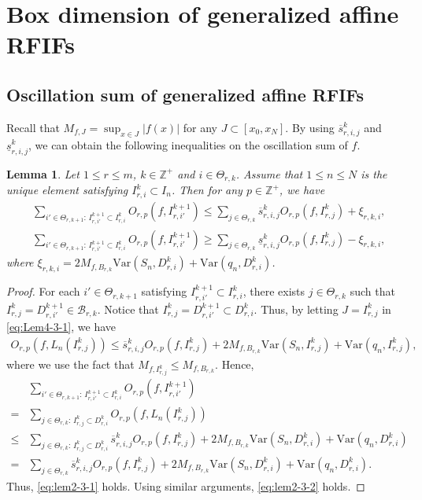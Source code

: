 \documentclass[11pt]{amsart}
\newtheorem{lem}[thm]{Lemma}
\theoremstyle{definition}
\theoremstyle{remark}
\numberwithin{equation}{section}
\newcommand{\Z}{{\mathbb Z}}
\newcommand{\mB}{{\mathcal B}}
\newcommand{\ups}{{\overline{s} }}
\newcommand{\lows}{{\underline{s}}}
\newcommand{\Var}{\mathrm{Var}}
\begin{document}
\section{Box dimension of generalized affine RFIFs}
\subsection{Oscillation sum of generalized affine RFIFs}

Recall that $M_{f,J}=\sup_{x \in J}|f(x)|$ for any $J\subset [x_0,x_N]$. 
By using $\ups_{r,i,j}^{k}$ and $\lows_{r,i,j}^{k}$, we can obtain the following inequalities on the oscillation sum of $f$.

\begin{lem}\label{lem:2-3}
	Let $1\leq r\leq m$, $k \in \Z^+$ and $i\in \Theta_{r,k}$. 	
	Assume that $1 \leq n \leq N$ is the unique element satisfying $I_{r,i}^k \subset I_{n}$.
	Then for any $p \in \mathbb{Z}^+$, we have
	\begin{align}
		&\sum_{i'\in \Theta_{r,k+1}:\, I_{r,i'}^{k+1}\subset I_{r,i}^k} O_{r,p}(f,I_{r,i'}^{k+1}) \leq \sum_{j\in\Theta_{r,k}} \ups_{r,i,j}^k O_{r,p}(f,I_{r,j}^k)+\xi_{r,k,i}, \label{eq:lem2-3-1}\\
		&\sum_{i'\in \Theta_{r,k+1}:\, I_{r,i'}^{k+1}\subset I_{r,i}^k} O_{r,p}(f,I_{r,i'}^{k+1}) \geq \sum_{j\in \Theta_{r,k}} \lows_{r,i,j}^k O_{r,p}(f,I_{r,j}^k)-\xi_{r,k,i}, \label{eq:lem2-3-2}
	\end{align}
	where $\xi_{r,k,i}=2 M_{f,B_{r,k}} \Var (S_{n},D_{r,i}^k)+\Var (q_{n},D_{r,i}^k)$.
\end{lem}

\begin{proof}
	For each $i'\in \Theta_{r,k+1}$ satisfying $I_{r,i'}^{k+1} \subset I_{r,i}^k$, there exists $j\in \Theta_{r,k}$ such that $I_{r,j}^k=D_{r,i'}^{k+1}\in \mB_{r,k}$. 
	Notice that $I_{r,j}^k=D_{r,i'}^{k+1}\subset D_{r,i}^k$. Thus, by letting $J=I_{r,j}^k$ in \eqref{eq:Lem4-3-1}, we have
	\begin{align*}%
		O_{r,p}(f,L_n(I_{r,j}^k)) \leq \ups_{r,i,j}^k O_{r,p}(f,I_{r,j}^k)+ 2 M_{f,B_{r,k}} \Var(S_n,I_{r,j}^k)+\Var(q_n,I_{r,j}^k),
	\end{align*}
	where we use the fact that $M_{f,I_{r,j}^k}\leq M_{f,B_{r,k}}$.	Hence,
	\begin{align*}
		&\sum_{i'\in \Theta_{r,k+1}:\, I_{r,i'}^{k+1}\subset I_{r,i}^k} O_{r,p}(f,I_{r,i'}^{k+1}) \\
		= &\sum_{j\in \Theta_{r,k}:\, I_{r,j}^k\subset D_{r,i}^k}O_{r,p}(f,L_n(I_{r,j}^k)) \\
		\leq &\sum_{j\in \Theta_{r,k}:\, I_{r,j}^k\subset D_{r,i}^k} \ups_{r,i,j}^k O_{r,p}(f,I_{r,j}^k)+2 M_{f,B_{r,k}} \Var (S_{n},D_{r,i}^k)+\Var (q_{n}, D_{r,i}^k)\\
		= &\sum_{j\in \Theta_{r,k}} \ups_{r,i,j}^k O_{r,p}(f,I_{r,j}^k)+2 M_{f,B_{r,k}} \Var (S_{n},D_{r,i}^k)+\Var (q_{n}, D_{r,i}^k).
	\end{align*}
	Thus, \eqref{eq:lem2-3-1} holds. Using similar arguments, \eqref{eq:lem2-3-2} holds.
\end{proof}
\end{document}

